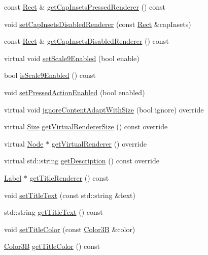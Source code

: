 \begin{DoxyCompactItemize}
const \hyperlink{classRect}{Rect} \& \hyperlink{classui_1_1Button_af89672f9e48eea3dd6389a1636ab2b08}{get\+Cap\+Insets\+Pressed\+Renderer} () const
\item 
void \hyperlink{classui_1_1Button_a98979d3dc729cf433cecc48fcc988d58}{set\+Cap\+Insets\+Disabled\+Renderer} (const \hyperlink{classRect}{Rect} \&cap\+Insets)
\item 
const \hyperlink{classRect}{Rect} \& \hyperlink{classui_1_1Button_ab004773e3d9b50b09923bc43c89eb19b}{get\+Cap\+Insets\+Disabled\+Renderer} () const
\item 
virtual void \hyperlink{classui_1_1Button_a7fb5abc162b5ccdd1e8efe732bdd3ec1}{set\+Scale9\+Enabled} (bool enable)
\item 
bool \hyperlink{classui_1_1Button_a272772f1ca027ea7e228580d1dc9b195}{is\+Scale9\+Enabled} () const
\item 
void \hyperlink{classui_1_1Button_aad300285ea4adb05794a60e24363ade4}{set\+Pressed\+Action\+Enabled} (bool enabled)
\item 
virtual void \hyperlink{classui_1_1Button_acc4c34750dcf72800cebb9bcd3a45b11}{ignore\+Content\+Adapt\+With\+Size} (bool ignore) override
\item 
virtual \hyperlink{classSize}{Size} \hyperlink{classui_1_1Button_aaae39c5dc7a9e11c1b68d4b0f3b7dcb0}{get\+Virtual\+Renderer\+Size} () const override
\item 
virtual \hyperlink{classNode}{Node} $\ast$ \hyperlink{classui_1_1Button_afa2bf5862c2e1893a34fbf88e5294fa3}{get\+Virtual\+Renderer} () override
\item 
virtual std\+::string \hyperlink{classui_1_1Button_a83561b6b24c0895c5aab6f746a6ecf61}{get\+Description} () const override
\item 
\hyperlink{classLabel}{Label} $\ast$ \hyperlink{classui_1_1Button_ab6cf9c1431bdb13d29f50a63d6cf7067}{get\+Title\+Renderer} () const
\item 
void \hyperlink{classui_1_1Button_a28183dc52fe6541ac1d85d7084cb5e78}{set\+Title\+Text} (const std\+::string \&text)
\item 
std\+::string \hyperlink{classui_1_1Button_abd02d3d7300b3b0bb0c29e18cae90190}{get\+Title\+Text} () const
\item 
void \hyperlink{classui_1_1Button_aaf0d3323454eb3b365e37c62fb87793c}{set\+Title\+Color} (const \hyperlink{structColor3B}{Color3B} \&color)
\item 
\hyperlink{structColor3B}{Color3B} \hyperlink{classui_1_1Button_a687c31578459d373399805a3ffa4e219}{get\+Title\+Color} () const

\end{DoxyCompactItemize}
